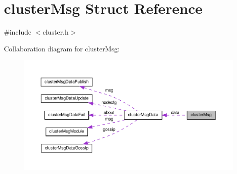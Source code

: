 \hypertarget{structcluster_msg}{}\section{cluster\+Msg Struct Reference}
\label{structcluster_msg}


{\ttfamily \#include $<$cluster.\+h$>$}



Collaboration diagram for cluster\+Msg\+:
\nopagebreak
\begin{figure}[H]
\begin{center}
\leavevmode
\includegraphics[width=350pt]{structcluster_msg__coll__graph}
\end{center}
\end{figure}
